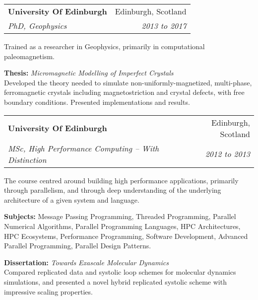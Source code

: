 \documentclass[11pt]{article}
\makeatletter
\newenvironment{resumeSubSectionHeader}{
    \par
    \begin{tabular*}{\textwidth}{l@{\extracolsep{\fill}}r}
    \par
} {
    \end{tabular*}
    \par
}
\newenvironment{resumeSubSectionBody}{
    \par
    \vspace{-0.2\parskip}
    \begin{small}
    \par
} {
    \par
    \end{small}
    \par
}
\newenvironment{resumeDescription}{
    \vspace{-0.5\baselineskip}
    \begin{description}
} {
    \end{description}
}
\makeatother
\begin{document}
%
%
\begin{resumeSubSectionHeader}

    \textbf{University Of Edinburgh}       & Edinburgh, Scotland \\
    \emph{PhD, Geophysics} & \emph{2013 to 2017} \\

\end{resumeSubSectionHeader}
\begin{resumeSubSectionBody}
    Trained as a researcher in Geophysics,
    primarily in computational paleomagnetism.
    \begin{resumeDescription}
        \item{
            {\bf Thesis:}
            \it Micromagnetic Modelling of Imperfect Crystals
        } \\
        Developed the theory needed to simulate non-uniformly-magnetized,
        multi-phase, ferromagnetic crystals including magnetostriction and
        crystal defects, with free boundary conditions.
        Presented implementations and results.
    \end{resumeDescription}
\end{resumeSubSectionBody}

\begin{resumeSubSectionHeader}

    \textbf{University Of Edinburgh}       & Edinburgh, Scotland \\
    \emph{MSc, High Performance Computing -- With Distinction} & \emph{2012 to 2013}

\end{resumeSubSectionHeader}
\begin{resumeSubSectionBody}

    The course centred around building high performance applications,
    primarily through parallelism, and through deep understanding
    of the underlying architecture of a given system and language.

    \begin{resumeDescription}
        \item{\bf Subjects:}
            Message Passing Programming, Threaded Programming,
            Parallel Numerical Algorithms,
            Parallel Programming Languages, HPC Architectures,
            HPC Ecosystems, Performance Programming,
            Software Development, Advanced Parallel Programming,
            Parallel Design Patterns.

        \item{
            {\bf Dissertation:}
            \it Towards Exascale Molecular Dynamics
        } \\
            Compared replicated data and systolic loop schemes for
            molecular dynamics simulations, and presented a novel hybrid
            replicated systolic scheme with impressive scaling properties.
    \end{resumeDescription}

\end{resumeSubSectionBody}
\end{document}
